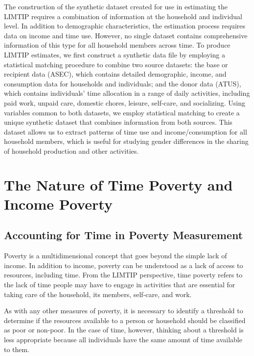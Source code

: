 \documentclass[
  11pt,
]{article}
\begin{document}
The construction of the synthetic dataset created for use in estimating
the LIMTIP requires a combination of information at the household and
individual level. In addition to demographic characteristics, the
estimation process requires data on income and time use. However, no
single dataset contains comprehensive information of this type for all
household members across time. To produce LIMTIP estimates, we first
construct a synthetic data file by employing a statistical matching
procedure to combine two source datasets: the base or recipient data
(ASEC), which contains detailed demographic, income, and consumption
data for households and individuals; and the donor data (ATUS), which
contains individuals' time allocation in a range of daily activities,
including paid work, unpaid care, domestic chores, leisure, self-care,
and socializing. Using variables common to both datasets, we employ
statistical matching to create a unique synthetic dataset that combines
information from both sources. This dataset allows us to extract
patterns of time use and income/consumption for all household members,
which is useful for studying gender differences in the sharing of
household production and other activities.

\section{The Nature of Time Poverty and Income
Poverty}\label{sec-timepoverty}

\subsection{Accounting for Time in Poverty
Measurement}\label{accounting-for-time-in-poverty-measurement}

Poverty is a multidimensional concept that goes beyond the simple lack
of income. In addition to income, poverty can be understood as a lack of
access to resources, including time. From the LIMTIP perspective, time
poverty refers to the lack of time people may have to engage in
activities that are essential for taking care of the household, its
members, self-care, and work.

As with any other measures of poverty, it is necessary to identify a
threshold to determine if the resources available to a person or
household should be classified as poor or non-poor. In the case of time,
however, thinking about a threshold is less appropriate because all
individuals have the same amount of time available to them.
\end{document}
